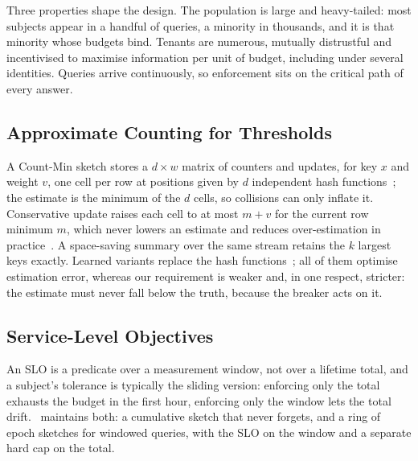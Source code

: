 Three properties shape the design. The population is large and heavy-tailed: most
subjects appear in a handful of queries, a minority in thousands, and it is that
minority whose budgets bind. Tenants are numerous, mutually distrustful and
incentivised to maximise information per unit of budget, including under several
identities. Queries arrive continuously, so enforcement sits on the critical path of
every answer.

\subsection{Approximate Counting for Thresholds}
\label{sec:bg-sketch}

A Count-Min sketch stores a $d\times w$ matrix of counters and updates, for key $x$
and weight $v$, one cell per row at positions given by $d$ independent hash
functions~\cite{fusy2023countmin}; the estimate is the minimum of the $d$ cells, so
collisions can only inflate it. Conservative update raises each cell to at most
$m+v$ for the current row minimum $m$, which never lowers an estimate and reduces
over-estimation in practice~\cite{fusy2022phase,fusy2023countmin}. A space-saving
summary over the same stream retains the $k$ largest keys exactly. Learned
variants replace the hash functions~\cite{nishishita2025optimized}; all of them
optimise estimation error, whereas our requirement is weaker and, in one respect,
stricter: the estimate must never fall below the truth, because the breaker acts on
it.

\subsection{Service-Level Objectives}
\label{sec:bg-slo}

An SLO is a predicate over a measurement window, not over a lifetime total, and a
subject's tolerance is typically the sliding version: enforcing only the total
exhausts the budget in the first hour, enforcing only the window lets the total drift. \sys\ maintains both: a cumulative sketch that never forgets, and a ring of epoch
sketches for windowed queries, with the SLO on the window and a separate hard cap on
the total.
